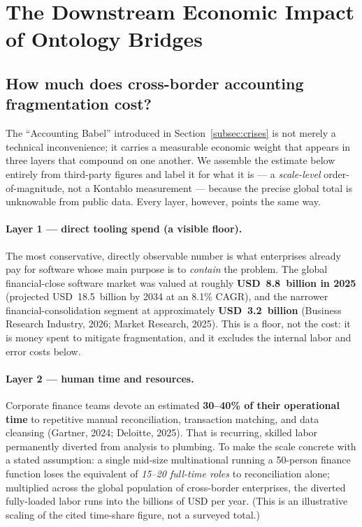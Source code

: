 \section{The Downstream Economic Impact of Ontology Bridges}

\subsection{How much does cross-border accounting fragmentation cost?}
\label{subsec:cost_of_fragmentation}
The ``Accounting Babel'' introduced in Section~\ref{subsec:crises} is not merely a technical
inconvenience; it carries a measurable economic weight that appears in three
layers that compound on one another. We assemble the estimate below entirely
from third-party figures and label it for what it is --- a \emph{scale-level}
order-of-magnitude, not a Kontablo measurement --- because the precise global
total is unknowable from public data. Every layer, however, points the same way.

\paragraph{Layer 1 --- direct tooling spend (a visible floor).} The most
conservative, directly observable number is what enterprises already pay for
software whose main purpose is to \emph{contain} the problem. The global
financial-close software market was valued at roughly \textbf{USD~8.8~billion in
2025} (projected USD~18.5~billion by 2034 at an 8.1\% CAGR), and the narrower
financial-consolidation segment at approximately \textbf{USD~3.2~billion}
(Business Research Industry, 2026; Market Research, 2025). This is a floor, not
the cost: it is money spent to mitigate fragmentation, and it excludes the
internal labor and error costs below.

\paragraph{Layer 2 --- human time and resources.} Corporate finance teams devote
an estimated \textbf{30--40\% of their operational time} to repetitive manual
reconciliation, transaction matching, and data cleansing (Gartner, 2024;
Deloitte, 2025). That is recurring, skilled labor permanently diverted from
analysis to plumbing. To make the scale concrete with a stated assumption: a
single mid-size multinational running a 50-person finance function loses the
equivalent of \emph{15--20 full-time roles} to reconciliation alone; multiplied
across the global population of cross-border enterprises, the diverted
fully-loaded labor runs into the billions of USD per year. (This is an
illustrative scaling of the cited time-share figure, not a surveyed total.)

